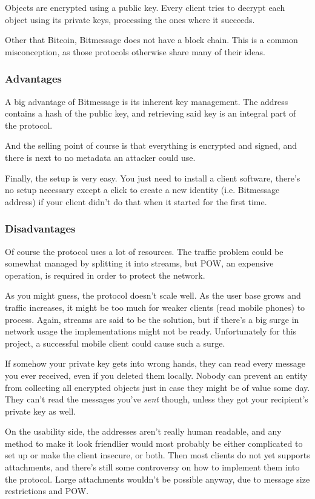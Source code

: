 \documentclass{bfh}
\begin{document}
  Objects are encrypted using a public key. Every client tries to decrypt each object using its private keys, processing the ones where it succeeds.

  Other that Bitcoin, Bitmessage does not have a block chain. This is a common misconception, as those protocols otherwise share many of their ideas.

  \subsubsection{Advantages}
  A big advantage of Bitmessage is its inherent key management. The address contains a hash of the public key, and retrieving said key is an integral part of the protocol.

  And the selling point of course is that everything is encrypted and signed, and there is next to no metadata an attacker could use.

  Finally, the setup is very easy. You just need to install a client software, there's no setup necessary except a click to create a new identity (i.e. Bitmessage address) if your client didn't do that when it started for the first time.

  \subsubsection{Disadvantages}
  Of course the protocol uses a lot of resources. The traffic problem could be somewhat managed by splitting it into streams\cite{wiki:stream}, but \acf{POW}, an expensive operation, is required in order to protect the network.

  As you might guess, the protocol doesn't scale well. As the user base grows and traffic increases, it might be too much for weaker clients (read mobile phones) to process. Again, streams are said to be the solution, but if there's a big surge in network usage the implementations might not be ready. Unfortunately for this project, a successful mobile client could cause such a surge.

  If somehow your private key gets into wrong hands, they can read every message you ever received, even if you deleted them locally. Nobody can prevent an entity from collecting all encrypted objects just in case they might be of value some day. They can't read the messages you've \textit{sent} though, unless they got your recipient's private key as well.

  On the usability side, the addresses aren't really human readable, and any method to make it look friendlier would most probably be either complicated to set up or make the client insecure, or both. Then most clients do not yet supports attachments, and there's still some controversy on how to implement them into the protocol. Large attachments wouldn't be possible anyway, due to message size restrictions and \ac{POW}.
\end{document}
